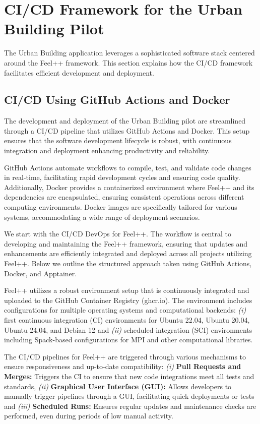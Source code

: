 \section{CI/CD Framework for the Urban Building Pilot}
The Urban Building application leverages a sophisticated software stack centered around the Feel++ framework. This section  explains how the CI/CD framework facilitates efficient development and deployment.

\subsection{CI/CD Using GitHub Actions and Docker}
The development and deployment of the Urban Building pilot are streamlined through a CI/CD pipeline that utilizes GitHub Actions and Docker. This setup ensures that the software development lifecycle is robust, with continuous integration and deployment enhancing productivity and reliability. 

GitHub Actions automate workflows to compile, test, and validate code changes in real-time, facilitating rapid development cycles and ensuring code quality. Additionally, Docker provides a containerized environment where Feel++ and its dependencies are encapsulated, ensuring consistent operations across different computing environments. Docker images are specifically tailored for various systems, accommodating a wide range of deployment scenarios.
    
We start with the CI/CD DevOps for Feel++. 
The workflow is central to developing and maintaining the Feel++ framework, ensuring that updates and enhancements are efficiently integrated and deployed across all projects utilizing Feel++. Below we outline the structured approach taken using GitHub Actions, Docker, and Apptainer.

Feel++ utilizes a robust environment setup that is continuously integrated and uploaded to the GitHub Container Registry (ghcr.io). The environment includes configurations for multiple operating systems and computational backends:
\textit{(i)} first continuous integration (CI) environments for Ubuntu 22.04, Ubuntu 20.04, Ubuntu 24.04, and Debian 12 and \textit{(ii)} scheduled integration (SCI) environments including Spack-based configurations for MPI and other computational libraries.

The CI/CD pipelines for Feel++ are triggered through various mechanisms to ensure responsiveness and up-to-date compatibility: \textit{(i)} \textbf{Pull Requests and Merges:} Triggers the CI to ensure that new code integrations meet all tests and standards, \textit{(ii)} \textbf{Graphical User Interface (GUI):} Allows developers to manually trigger pipelines through a GUI, facilitating quick deployments or tests and \textit{(iii)} \textbf{Scheduled Runs:} Ensures regular updates and maintenance checks are performed, even during periods of low manual activity.

